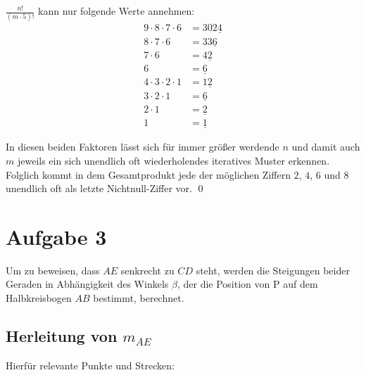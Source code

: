 \documentclass[12pt,a4paper,oneside]{article}
\begin{document}
$\frac{n!}{(m\cdot5)!}$ kann nur folgende Werte annehmen:
\begin{equation*}
	\begin{split}
		9\cdot8\cdot7\cdot6 &= 302\underline{4} \\
		8\cdot7\cdot6 &= 33\underline{6} \\
		7\cdot6 &= 4\underline{2} \\
		6 &= \underline{6} \\
		4\cdot3\cdot2\cdot1 &= 1\underline{2} \\
		3\cdot2\cdot1 &= \underline{6} \\
		2\cdot1 &= \underline{2} \\
		1 &= \underline{1}
	\end{split}
\end{equation*}

In diesen beiden Faktoren lässt sich für immer größer werdende $n$ und damit auch $m$ jeweils ein sich unendlich oft wiederholendes iteratives Muster erkennen. Folglich kommt in dem Gesamtprodukt jede der möglichen Ziffern $2$, $4$, $6$ und $8$ unendlich oft als letzte Nichtnull-Ziffer vor. \qed

\pagebreak
\section[]{Aufgabe 3}
\setlength{\mathindent}{4cm}

Um zu beweisen, dass $AE$ senkrecht zu $CD$ steht, werden die Steigungen beider Geraden in Abhängigkeit des Winkels $\beta$, der die Position von P auf dem Halbkreisbogen $AB$ bestimmt, berechnet.

\subsection[]{Herleitung von $m_{AE}$}
Hierfür relevante Punkte und Strecken:

\newcommand{\Koordinaten}{
	\coordinate (m) at (0,0);
	\coordinate (a) at (-1,0);
	\coordinate (b) at (1,0);
	\coordinate (c) at (-0.5,0.866);
	\coordinate (p) at (0.5,0.866);
	\coordinate (e) at (0.866,0.5);
}
\newcommand{\Halbkreis}{
	\begin{scope}
		\clip (a) rectangle (1,1);
		\draw[black] (m) circle(1);
		\draw[black] (a) -- (b);
	\end{scope}
}
\end{document}
